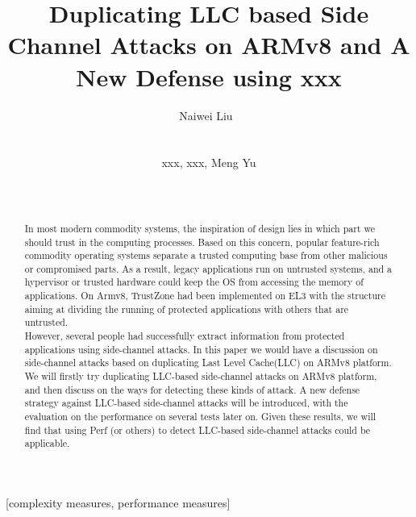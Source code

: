 \documentclass{sig-alternate}
\begin{document}

\title{Duplicating LLC based Side Channel Attacks on ARMv8 and A New Defense using xxx}


\author{
\alignauthor
Naiwei Liu\
       \\
       \\
       \\
\alignauthor
 xxx, xxx, Meng Yu\\
       \\
       \\
}

\maketitle
\begin{abstract}
In most modern commodity systems, the inspiration of design lies in which part we should trust in the computing processes. Based on this concern, popular feature-rich commodity operating systems separate a trusted computing base from other malicious or compromised parts. As a result, legacy applications run on untrusted systems, and a hypervisor or trusted hardware could keep the OS from accessing the memory of applications. On Armv8, TrustZone had been implemented on EL3 with the structure aiming at dividing the running of protected applications with others that are untrusted.
\\
\indent
However, several people had successfully extract information from protected applications using side-channel attacks. In this paper we would have a discussion on side-channel attacks based on duplicating Last Level Cache(LLC) on ARMv8 platform. We will firstly try duplicating LLC-based side-channel attacks on ARMv8 platform, and then discuss on the ways for detecting these kinds of attack. A new defense strategy against LLC-based side-channel attacks will be introduced, with the evaluation on the performance on several tests later on. Given these results, we will find that using Perf (or others) to detect LLC-based side-channel attacks could be applicable.
\end{abstract}

[complexity measures, performance measures]
\end{document}
